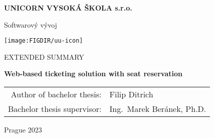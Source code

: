 \pagestyle{empty}
\begin{center}

{\bfseries\large UNICORN VYSOKÁ ŠKOLA s.r.o.}

    \vspace{3mm}

    {\Large Softwarový vývoj}

    \vfill
    \vspace{3mm}

    \centerline{\mbox{\texttt{[image: \\FIGDIR/uu-icon]}}}

    \vfill
    \vspace{3mm}

    {\normalsize\MakeUppercase{Extended Summary}}

    \vspace{6mm}

    {\LARGE\bfseries Web-based ticketing solution with seat reservation}

    \vfill

    \begin{tabular}{rl}
        Author of bachelor thesis: & Filip Ditrich\\
        \noalign{\vspace{2mm}}
        Bachelor thesis supervisor: & Ing.\ Marek Beránek, Ph.D.\\
    \end{tabular}

    \vfill

    Prague 2023

\end{center}
